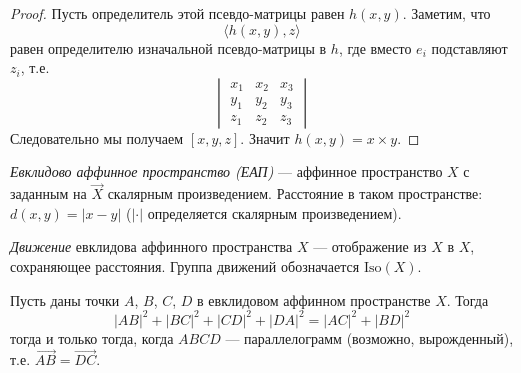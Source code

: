 \documentclass[12pt,a4paper]{article}
\newcommand{\Iso}{\ensuremath{\mathrm{Iso}}\xspace}
\begin{document}
    \begin{proof}
        Пусть определитель этой псевдо-матрицы равен $h(x, y)$. Заметим, что
        \[\langle h(x, y), z \rangle\]
        равен определителю изначальной псевдо-матрицы в $h$, где вместо $e_i$ подставляют $z_i$, т.е.
        \[
            \begin{vmatrix}
                x_1& x_2& x_3\\
                y_1& y_2& y_3\\
                z_1& z_2& z_3
            \end{vmatrix}
        \]
        Следовательно мы получаем $[x, y, z]$. Значит $h(x, y) = x \times y$.
    \end{proof}

    \begin{definition}
        \emph{Евклидово аффинное пространство (ЕАП)} --- аффинное пространство $X$ с заданным на $\overrightarrow{X}$ скалярным произведением. Расстояние в таком пространстве: $d(x, y) = |x-y|$ ($|\cdot|$ определяется скалярным произведением).
    \end{definition}

    \begin{definition}
        \emph{Движение} евклидова аффинного пространства $X$ --- отображение из $X$ в $X$, сохраняющее расстояния. Группа движений обозначается $\Iso(X)$.
    \end{definition}

    \begin{lemma}\label{parallelogram-equality-lemma}
        Пусть даны точки $A$, $B$, $C$, $D$ в евклидовом аффинном пространстве $X$. Тогда
        \[|AB|^2 + |BC|^2 + |CD|^2 + |DA|^2 = |AC|^2 + |BD|^2\]
        тогда и только тогда, когда $ABCD$ --- параллелограмм (возможно, вырожденный), т.е. $\overrightarrow{AB} = \overrightarrow{DC}$.
    \end{lemma}
\end{document}
